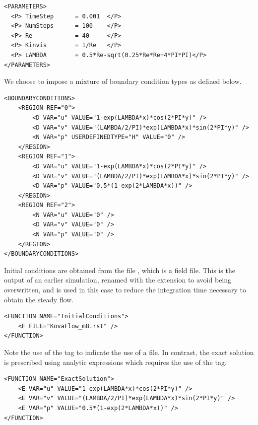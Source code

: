 \begin{lstlisting}[style=XMLStyle]
<PARAMETERS>
  <P> TimeStep      = 0.001  </P>
  <P> NumSteps      = 100    </P>
  <P> Re            = 40     </P>
  <P> Kinvis        = 1/Re   </P>
  <P> LAMBDA        = 0.5*Re-sqrt(0.25*Re*Re+4*PI*PI)</P>
</PARAMETERS>
\end{lstlisting}

We choose to impose a mixture of boundary condition types as defined below.

\begin{lstlisting}[style=XMLStyle]
<BOUNDARYCONDITIONS>
    <REGION REF="0">
        <D VAR="u" VALUE="1-exp(LAMBDA*x)*cos(2*PI*y)" />
        <D VAR="v" VALUE="(LAMBDA/2/PI)*exp(LAMBDA*x)*sin(2*PI*y)" />
        <N VAR="p" USERDEFINEDTYPE="H" VALUE="0" />
    </REGION>
    <REGION REF="1">
        <D VAR="u" VALUE="1-exp(LAMBDA*x)*cos(2*PI*y)" />
        <D VAR="v" VALUE="(LAMBDA/2/PI)*exp(LAMBDA*x)*sin(2*PI*y)" />
        <D VAR="p" VALUE="0.5*(1-exp(2*LAMBDA*x))" />
    </REGION>
    <REGION REF="2">
        <N VAR="u" VALUE="0" />
        <D VAR="v" VALUE="0" />
        <N VAR="p" VALUE="0" />
    </REGION>
</BOUNDARYCONDITIONS>
\end{lstlisting}

Initial conditions are obtained from the file , which is
a \nekpp field file. This is the output of an earlier simulation, renamed with
the extension  to avoid being overwritten, and is used in this case
to reduce the integration time necessary to obtain the steady flow.
\begin{lstlisting}[style=XMLStyle]
<FUNCTION NAME="InitialConditions">
    <F FILE="KovaFlow_m8.rst" />
</FUNCTION>
\end{lstlisting}
Note the use of the  tag to indicate the use of a file. In contrast,
the exact solution is prescribed using analytic expressions which requires the
use of the  tag.
\begin{lstlisting}[style=XMLStyle]
<FUNCTION NAME="ExactSolution">
    <E VAR="u" VALUE="1-exp(LAMBDA*x)*cos(2*PI*y)" />
    <E VAR="v" VALUE="(LAMBDA/2/PI)*exp(LAMBDA*x)*sin(2*PI*y)" />
    <E VAR="p" VALUE="0.5*(1-exp(2*LAMBDA*x))" />
</FUNCTION>
\end{lstlisting}


